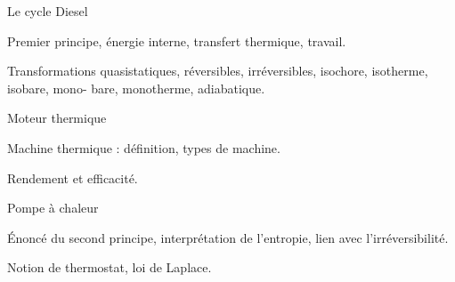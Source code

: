 
\Classe[PCSI]


\begin{Exocolle}{Le cycle Diesel}
  \item Premier principe, énergie interne, transfert thermique, travail.
  \item Transformations quasistatiques, réversibles, irréversibles, isochore, isotherme, isobare, mono-
  bare, monotherme, adiabatique.
\end{Exocolle}


\begin{Exocolle}{Moteur thermique}
  \item Machine thermique : définition, types de machine.
  \item Rendement et efficacité.
\end{Exocolle}

\begin{Exocolle}{Pompe à chaleur}
  \item 
  Énoncé du second principe, interprétation de l'entropie, lien avec l'irréversibilité.
  \item Notion de thermostat, loi de Laplace.
\end{Exocolle}



